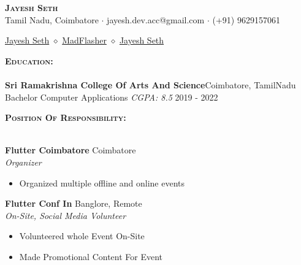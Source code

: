 \documentclass[a4paper]{article}
\newcommand{\lineunder} {
    \vspace*{-8pt} \\
    \hspace*{-18pt} \hrulefill \\
}
\newcommand{\header} [1] {
    {\hspace*{-18pt}\vspace*{6pt} \textsc{#1} }
    \vspace*{-6pt} \lineunder
}
\begin{document}
\vspace*{-50pt}

    

\vspace*{-10pt}
\begin{center}
	{\Huge \bfseries \scshape {Jayesh Seth}}\\
	 Tamil Nadu, Coimbatore $\cdot$ 
         jayesh.dev.acc@gmail.com $\cdot$ 
         (+91) 9629157061\\
\end{center}

\begin{center}
    \href{https://www.linkedin.com/in/jayesh-seth-0b80a8217/}{Jayesh Seth} $\diamond$ 
     \href{https://github.com/MadFlasheroo7}{MadFlasher} $\diamond$
     \href{https://twitter.com/Madflasheroo7}{Jayesh Seth}\\
\end{center}

\header{ \textbf{Education:}}
\textbf{Sri Ramakrishna College Of Arts And Science}\hfill Coimbatore, TamilNadu\\
Bachelor Computer Applications \textit{CGPA: 8.5} \hfill 2019 - 2022\\
\vspace*{4pt}

\header{ \textbf{Position Of Responsibility:}}
\vspace{1mm}

\textbf{Flutter Coimbatore} \hfill Coimbatore\\
\textit{Organizer}\\
\vspace{-1mm} 
\begin{itemize} \itemsep 1pt
    \item Organized multiple offline and online events
\end{itemize}

\textbf{Flutter Conf In} \hfill Banglore, Remote\\
\textit{On-Site, Social Media Volunteer}\\
\vspace{-1mm}
\begin{itemize} \itemsep 1pt
	\item Volunteered whole Event On-Site
	\item Made Promotional Content For Event
\end{itemize}
\end{document}
